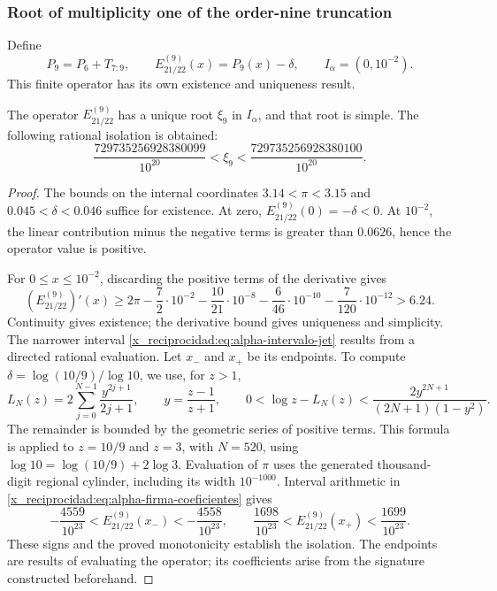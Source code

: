 \subsubsection{Root of multiplicity one of the order-nine truncation}
\label{x_reciprocidad:subsec:alpha-jet}

Define
\[
 P_9=P_6+T_{7:9},\qquad E_{21/22}^{(9)}(x)=P_9(x)-\delta,
 \qquad I_\alpha=(0,10^{-2}).
\]
This finite operator has its own existence and uniqueness result.

\begin{proposition}
\label{x_reciprocidad:prop:alpha-raiz-jet}
The operator \(E_{21/22}^{(9)}\) has a unique root
\(\xi_9\) in \(I_\alpha\), and that root is simple. The following rational isolation is obtained:
\begin{equation}
 \frac{729735256928380099}{10^{20}}
 <\xi_9<\frac{729735256928380100}{10^{20}}.
 \label{x_reciprocidad:eq:alpha-intervalo-jet}
\end{equation}
\end{proposition}

\begin{proof}
The bounds on the internal coordinates
\(3.14<\pi<3.15\) and
\(0.045<\delta<0.046\) suffice for existence. At zero,
\(E_{21/22}^{(9)}(0)=-\delta<0\). At \(10^{-2}\), the linear
contribution minus the negative terms is greater than \(0.0626\), hence the
operator value is positive.

For \(0\leq x\leq10^{-2}\), discarding the positive terms of
the derivative gives
\[
 (E_{21/22}^{(9)})'(x)
 \geq2\pi-\frac72\cdot10^{-2}
 -\frac{10}{21}\cdot10^{-8}-\frac6{46}\cdot10^{-10}
 -\frac7{120}\cdot10^{-12}>6.24.
\]
Continuity gives existence; the derivative bound gives uniqueness and
simplicity. The narrower interval
\eqref{x_reciprocidad:eq:alpha-intervalo-jet} results from a directed rational evaluation.
Let \(x_-\) and \(x_+\) be its endpoints. To compute
\(\delta=\log(10/9)/\log 10\), we use, for \(z>1\),
\[
 L_N(z)=2\sum_{j=0}^{N-1}\frac{y^{2j+1}}{2j+1},\qquad
 y=\frac{z-1}{z+1},\qquad
 0<\log z-L_N(z)<\frac{2y^{2N+1}}{(2N+1)(1-y^2)}.
\]
The remainder is bounded by the geometric series of positive terms.
This formula is applied to \(z=10/9\) and \(z=3\), with \(N=520\),
using \(\log 10=\log(10/9)+2\log3\). Evaluation of
\(\pi\) uses the generated thousand-digit regional cylinder, including
its width \(10^{-1000}\). Interval arithmetic in
\eqref{x_reciprocidad:eq:alpha-firma-coeficientes} gives
\[
 -\frac{4559}{10^{23}}<E_{21/22}^{(9)}(x_-)< -\frac{4558}{10^{23}},
 \qquad
 \frac{1698}{10^{23}}<E_{21/22}^{(9)}(x_+)<\frac{1699}{10^{23}}.
\]
These signs and the proved monotonicity establish the isolation. The endpoints
are results of evaluating the operator; its coefficients arise from
the signature constructed beforehand.
\end{proof}


